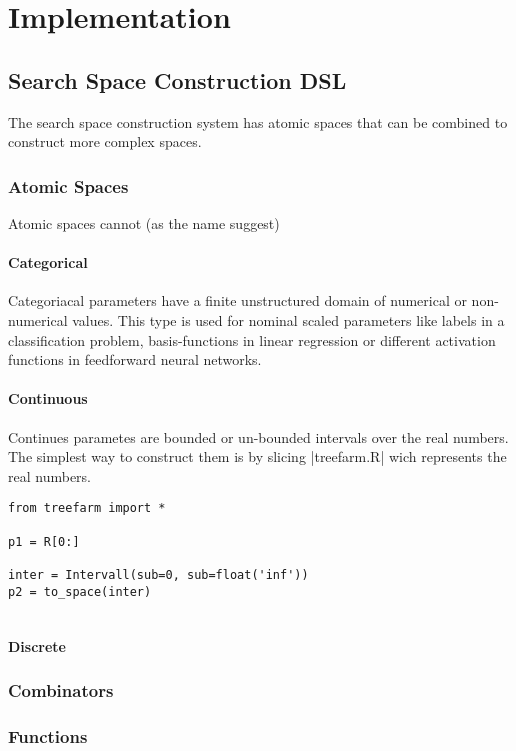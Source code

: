 \documentclass[english]{article}
\begin{document}
\section{Implementation}
\subsection{Search Space Construction DSL}
The search space construction system has atomic spaces that can
be combined to construct more complex spaces.

\subsubsection{Atomic Spaces}
Atomic spaces cannot (as the name suggest)

\paragraph{Categorical}
Categoriacal parameters have a finite unstructured domain of numerical or non-numerical values. This type is used for nominal scaled parameters like labels in a classification problem, basis-functions in linear regression or different activation functions in feedforward neural networks.

\paragraph{Continuous}
Continues parametes are bounded or un-bounded intervals over the real numbers. The simplest way to construct them is by slicing |treefarm.R| wich represents the real numbers.
\begin{verbatim}
from treefarm import *

p1 = R[0:]

inter = Intervall(sub=0, sub=float('inf'))
p2 = to_space(inter)


\end{verbatim}


\paragraph{Discrete}



\subsubsection{Combinators}

\subsubsection{Functions}
\end{document}
